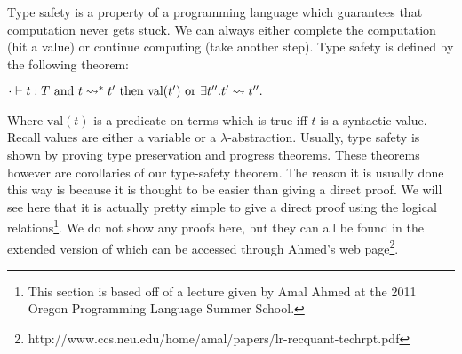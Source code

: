 Type safety is a property of a programming language which guarantees
that computation never gets stuck.  We can always either complete the
computation (hit a value) or continue computing (take another
step). Type safety is defined by the following theorem:
\begin{thm}
  \label{thm:type_safety}
  \begin{math}
    \cdot \vdash t : T \text{ and } t \rightsquigarrow^* t' \text{ then }
    \text{val}(t') \text{ or } \exists t''.t' \rightsquigarrow t''.
  \end{math}
\end{thm}
\noindent
Where $\text{val}(t)$ is a predicate on terms which is true iff $t$ is
a syntactic value.  Recall values are either a variable or a
$\lambda$-abstraction.  Usually, type safety is shown by proving type
preservation and progress theorems.  These theorems however are
corollaries of our type-safety theorem.  The reason it is usually done
this way is because it is thought to be easier than giving a direct
proof.  We will see here that it is actually pretty simple to give a
direct proof using the logical relations\footnote{This section is
  based off of a lecture given by Amal Ahmed at the 2011 Oregon
  Programming Language Summer School.}.  We do not show any proofs
here, but they can all be found in the extended version of
\cite{Ahmed:2006} which can be accessed through Ahmed's web
page\footnote{http://www.ccs.neu.edu/home/amal/papers/lr-recquant-techrpt.pdf}.

